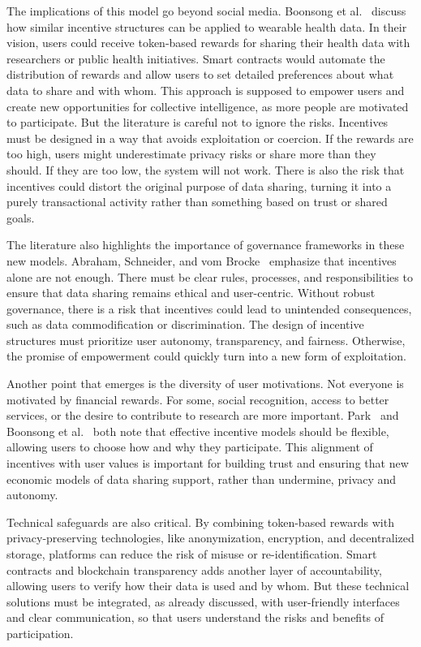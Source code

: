 	The implications of this model go beyond social media. Boonsong et al.~\cite{Boonsong2024} discuss how similar incentive structures can be applied to wearable health data. In their vision, users could receive token-based rewards for sharing their health data with researchers or public health initiatives. Smart contracts would automate the distribution of rewards and allow users to set detailed preferences about what data to share and with whom. This approach is supposed to empower users and create new opportunities for collective intelligence, as more people are motivated to participate. But the literature is careful not to ignore the risks. Incentives must be designed in a way that avoids exploitation or coercion. If the rewards are too high, users might underestimate privacy risks or share more than they should. If they are too low, the system will not work. There is also the risk that incentives could distort the original purpose of data sharing, turning it into a purely transactional activity rather than something based on trust or shared goals.

	The literature also highlights the importance of governance frameworks in these new models. Abraham, Schneider, and vom Brocke~\cite{Abraham2019} emphasize that incentives alone are not enough. There must be clear rules, processes, and responsibilities to ensure that data sharing remains ethical and user-centric. Without robust governance, there is a risk that incentives could lead to unintended consequences, such as data commodification or discrimination. The design of incentive structures must prioritize user autonomy, transparency, and fairness. Otherwise, the promise of empowerment could quickly turn into a new form of exploitation.

	Another point that emerges is the diversity of user motivations. Not everyone is motivated by financial rewards. For some, social recognition, access to better services, or the desire to contribute to research are more important. Park~\cite{Park2023} and Boonsong et al.~\cite{Boonsong2024} both note that effective incentive models should be flexible, allowing users to choose how and why they participate. This alignment of incentives with user values is important for building trust and ensuring that new economic models of data sharing support, rather than undermine, privacy and autonomy.

	Technical safeguards are also critical. By combining token-based rewards with privacy-preserving technologies, like anonymization, encryption, and decentralized storage, platforms can reduce the risk of misuse or re-identification. Smart contracts and blockchain transparency adds another layer of accountability, allowing users to verify how their data is used and by whom. But these technical solutions must be integrated, as already discussed, with user-friendly interfaces and clear communication, so that users understand the risks and benefits of participation.


